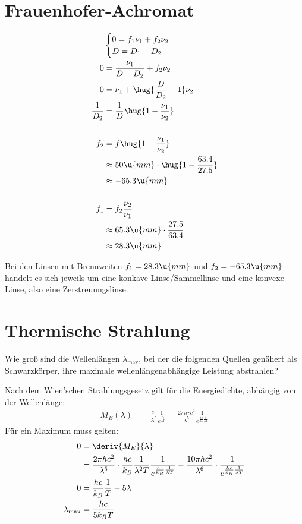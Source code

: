 \documentclass[ex]{exercise}
\begin{document}
\section{Frauenhofer-Achromat}
\begin{align*}
    &\begin{cases}
        0=f_1\nu_1 + f_2\nu_2\\
        D=D_1+D_2\\
    \end{cases}\\
    0&= \frac{\nu_1}{D-D_2} + f_2\nu_2\\
    0&= \nu_1 + \hug{\frac{D}{D_2}-1}\nu_2\\
    \frac{1}{D_2} &= \frac{1}{D}\hug{1-\frac{\nu_1}{\nu_2}}\\
    \\
    f_2 &= f\hug{1-\frac{\nu_1}{\nu_2}}\\
    &\approx 50\u{mm}\cdot  \hug{1-\frac{63.4}{27.5}}\\
    &\approx -65.3\u{mm}\\
    \\
    f_1 &= f_2\frac{\nu_2}{\nu_1}\\
    &\approx 65.3\u{mm}\cdot \frac{27.5}{63.4}\\
    &\approx 28.3\u{mm}
\end{align*}

Bei den Linsen mit Brennweiten \(f_1=28.3\u{mm}\) und \(f_2=-65.3\u{mm}\)
handelt es sich jeweils um eine konkave Linse/Sammellinse und 
eine konvexe Linse, also eine Zerstreuungslinse.

\section{Thermische Strahlung}
Wie gro{\ss} sind die Wellenlängen \(\lambda_{\max}\), bei 
der die folgenden Quellen genähert als Schwarzkörper,
ihre maximale wellenlängenabhängige Leistung abstrahlen?

\dottedlinett

Nach dem Wien'schen Strahlungsgesetz gilt für die Energiedichte, abhängig von der Wellenlänge:
\begin{align*}
    M_E(\lambda) &= \frac{c_1}{\lambda^5} \frac{1}{e^{\frac{c_2}{\lambda T}}}
        = \frac{2\pi hr c^2}{\lambda^5} \frac{1}{e^{\frac{h c}{k_B}\frac{1}{\lambda T}}}
\end{align*}
Für ein Maximum muss gelten:
\begin{align*}
    0 &= \deriv{M_E}{\lambda} \\
    &= \frac{2\pi h c^2}{\lambda^5} \cdot \frac{h c}{k_B}\frac{1}{\lambda^2 T}  \frac{1}{e^{\frac{h c}{k_B}\frac{1}{\lambda T}}} 
    -\frac{10\pi h c^2}{\lambda^6}\cdot \frac{1}{e^{\frac{h c}{k_B}\frac{1}{\lambda T}}}\\
    0 &= \frac{h c}{k_B}\frac{1}{T} - 5 \lambda\\
    \lambda_{\max} &= \frac{h c}{5 k_B T}                  
\end{align*}
\end{document}
